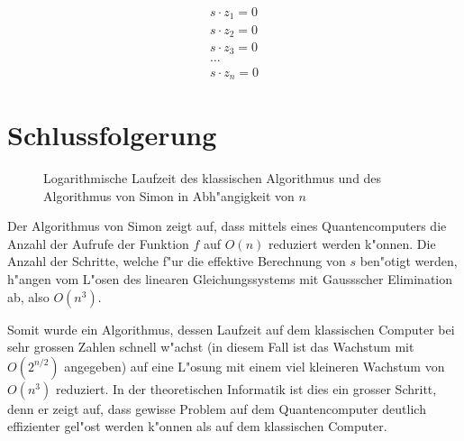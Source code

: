 \begin{refsection}
\begin{align*}
    s \cdot z_{1} = 0
    \\
    s \cdot z_{2} = 0
    \\
    s \cdot z_{3} = 0
    \\
    \dots
    \\
    s \cdot z_{n} = 0
\end{align*}

\section{Schlussfolgerung}

\begin{figure}
\centering
{}
\caption{Logarithmische Laufzeit des klassischen Algorithmus und des
Algorithmus von Simon in Abh"angigkeit von $n$\label{simon:laufzeitgraph}}
\end{figure}

Der Algorithmus von Simon zeigt auf, dass mittels eines Quantencomputers die
Anzahl der Aufrufe der Funktion $f$ auf $O(n)$ reduziert werden k"onnen. Die
Anzahl der Schritte, welche f"ur die effektive Berechnung von $s$ ben"otigt
werden, h"angen vom L"osen des linearen Gleichungssystems mit Gaussscher
Elimination ab, also $O(n^3)$. 
\cite{simon:cs191}

Somit wurde ein Algorithmus, dessen Laufzeit auf dem klassischen Computer bei
sehr grossen Zahlen schnell w"achst (in diesem Fall ist das Wachstum mit
$O(2^{n/2})$ angegeben) auf eine L"osung mit einem viel kleineren Wachstum von
$O(n^3)$ reduziert. In der theoretischen Informatik ist dies ein grosser
Schritt, denn er zeigt auf, dass gewisse Problem auf dem Quantencomputer
deutlich effizienter gel"ost werden k"onnen als auf dem klassischen Computer.


\printbibliography[heading=subbibliography] \end{refsection}


